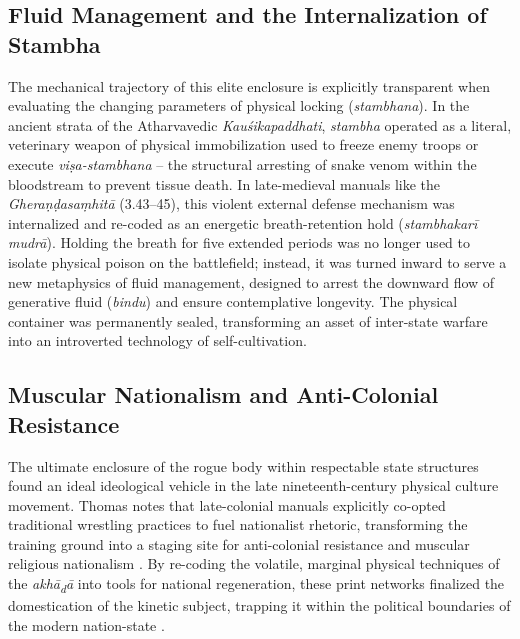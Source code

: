 \documentclass[11pt,twoside,letterpaper]{article}
\begin{document}
\subsection{Fluid Management and the Internalization of Stambha}

The mechanical trajectory of this elite enclosure is explicitly transparent when evaluating the changing parameters of physical locking (\textit{stambhana}). In the ancient strata of the Atharvavedic \textit{Kauśikapaddhati}, \textit{stambha} operated as a literal, veterinary weapon of physical immobilization used to freeze enemy troops or execute \textit{viṣa-stambhana} -- the structural arresting of snake venom within the bloodstream to prevent tissue death. In late-medieval manuals like the \textit{Gheraṇḍasaṃhitā} (3.43--45), this violent external defense mechanism was internalized and re-coded as an energetic breath-retention hold (\textit{stambhakarī mudrā}). Holding the breath for five extended periods was no longer used to isolate physical poison on the battlefield; instead, it was turned inward to serve a new metaphysics of fluid management, designed to arrest the downward flow of generative fluid (\textit{bindu}) and ensure contemplative longevity. The physical container was permanently sealed, transforming an asset of inter-state warfare into an introverted technology of self-cultivation.

\subsection{Muscular Nationalism and Anti-Colonial Resistance}
The ultimate enclosure of the rogue body within respectable state structures found an ideal ideological vehicle in the late nineteenth-century physical culture movement. Thomas notes that late-colonial manuals explicitly co-opted traditional wrestling practices to fuel nationalist rhetoric, transforming the training ground into a staging site for anti-colonial resistance and muscular religious nationalism \cite{Thomas2025}. By re-coding the volatile, marginal physical techniques of the \textit{akh\={a}\textsubscript{d}\={a}} into tools for national regeneration, these print networks finalized the domestication of the kinetic subject, trapping it within the political boundaries of the modern nation-state \cite{Thomas2025}.
\end{document}
